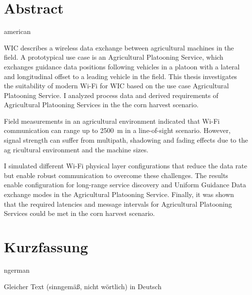 \chapter*{Abstract}
\begin{otherlanguage*}{american}

\begin{comment}
    about 1/2 page:
\begin{enumerate}
    \item Motivation (Why do we care?)
    \item Problem statement (What problem are we trying to solve?)
    \item Approach (How did we go about it)
    \item Results (What's the answer?)
    \item Conclusion (What are the implications of the answer?)
\end{enumerate}

The abstract is a miniature version of the thesis.
It should be treated as an entirely separate document.
Do not assume that a reader who has access to an abstract will also have access to the thesis.
Do not assume that a reader who reads the thesis has read the abstract.

\end{comment}

\ac{WIC} describes a wireless data exchange between agricultural machines in the field.
A prototypical use case is an Agricultural Platooning Service, which exchanges guidance data positions following
vehicles in a platoon with a lateral and longitudinal offset to a leading vehicle in the field.
This thesis investigates the suitability of modern Wi-Fi for \ac{WIC} based on the use case Agricultural Platooning Service.
I analyzed process data and derived requirements of Agricultural Platooning Services in the the corn harvest scenario.

Field measurements in an agricultural environment indicated that Wi-Fi communication can range up to \SI{2500}{\metre} in
a line-of-sight scenario.
However, signal strength can suffer from multipath, shadowing and fading effects due to the ag
ricultural environment and the machine sizes.


I simulated different Wi-Fi physical layer configurations that reduce the data rate but
enable robust communication to overcome these challenges.
The results enable configuration for long-range service discovery and Uniform Guidance Data exchange modes
in the Agricultural Platooning Service.
Finally, it was shown that the required latencies and message intervals for Agricultural Platooning Services could be met in the corn harvest
scenario.

\end{otherlanguage*}

\chapter*{Kurzfassung}
\begin{otherlanguage*}{ngerman}

Gleicher Text (sinngemäß, nicht wörtlich) in Deutsch

\end{otherlanguage*}
\acresetall

\cleardoublepage